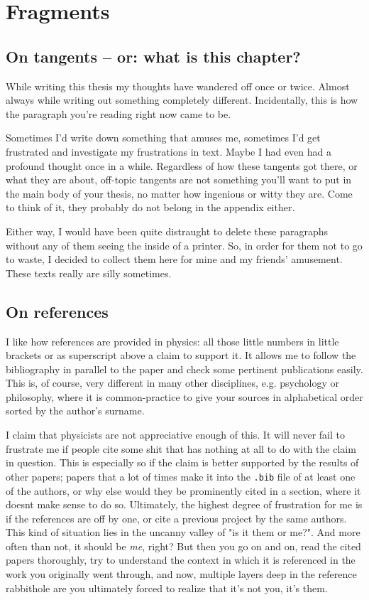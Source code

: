 \chapter{Fragments}
\label{ch:fragments}

\section*{On tangents -- or: what is this chapter?}
While writing this thesis my thoughts have wandered off once or twice. Almost
always while writing out something completely different. Incidentally, this is
how the paragraph you're reading right now came to be.

Sometimes I'd write down something that amuses me, sometimes I'd get frustrated
and investigate my frustrations in text. Maybe I had even had a profound
thought once in a while.  Regardless of how these tangents got there, or what
they are about, off-topic tangents are not something you'll want to put in the
main body of your thesis, no matter how ingenious or witty they are.  Come to
think of it, they probably do not belong in the appendix either.

Either way, I would have been quite distraught to delete these paragraphs
without any of them seeing the inside of a printer. So, in order for them not
to go to waste, I decided to collect them here for mine and my friends'
amusement. These texts really are silly sometimes.

\section*{On references}
I like how references are provided in physics: all those little numbers in
little brackets or as superscript above a claim to support it. It allows me to
follow the bibliography in parallel to the paper and check some pertinent
publications easily. This is, of course, very different in many other
disciplines, e.g. psychology or philosophy, where it is common-practice to give
your sources in alphabetical order sorted by the author's surname.

I claim that physicists are not appreciative enough of this. It will never fail
to frustrate me if people cite some shit that has nothing at all to do with the
claim in question. This is especially so if the claim is better supported by
the results of other papers; papers that a lot of times make it into the
\texttt{.bib} file of at least one of the authors, or why else would they be
prominently cited in a section, where it doesnt make sense to do so.
Ultimately, the highest degree of frustration for me is if the references are
off by one, or cite a previous project by the same authors. This kind of
situation lies in the uncanny valley of "is it them or me?". And more often
than not, it should be \emph{me}, right? But then you go on and on, read the
cited papers thoroughly, try to understand the context in which it is
referenced in the work you originally went through, and now, multiple layers
deep in the reference rabbithole are you ultimately forced to realize that it's
not you, it's them. 

